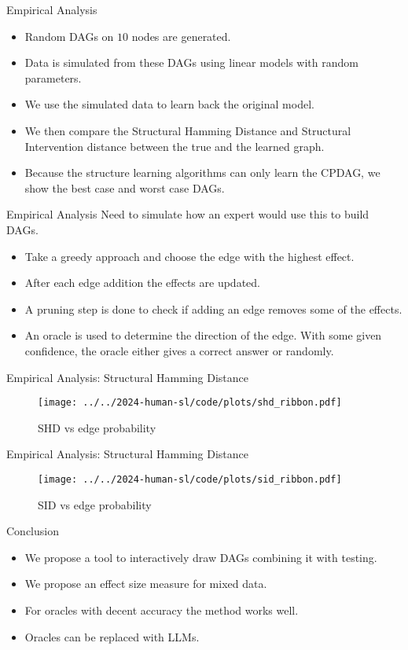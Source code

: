 \documentclass{beamer}
\begin{document}
\begin{frame}{Empirical Analysis}
	\begin{itemize}
		\item Random DAGs on $ 10 $ nodes are generated.
		\item Data is simulated from these DAGs using linear models with random parameters.
		\item We use the simulated data to learn back the original model.
		\item We then compare the Structural Hamming Distance and Structural Intervention distance between the true and the learned graph.
		\item Because the structure learning algorithms can only learn the CPDAG, we show the best case and worst case DAGs.
	\end{itemize}
\end{frame}

\begin{frame}{Empirical Analysis}
	Need to simulate how an expert would use this to build DAGs.
	\begin{itemize}
		\item Take a greedy approach and choose the edge with the highest effect.
		\item After each edge addition the effects are updated.
		\item A pruning step is done to check if adding an edge removes some of the effects.
		\item An oracle is used to determine the direction of the edge. With some given confidence, the oracle either gives
			a correct answer or randomly.
	\end{itemize}
\end{frame}

\begin{frame}{Empirical Analysis: Structural Hamming Distance}
	\begin{figure}
		\centering
		\texttt{[image: ../../2024-human-sl/code/plots/shd\_ribbon.pdf]}
		\caption{SHD vs edge probability}
	\end{figure}
\end{frame}

\begin{frame}{Empirical Analysis: Structural Hamming Distance}
	\begin{figure}
		\centering
		\texttt{[image: ../../2024-human-sl/code/plots/sid\_ribbon.pdf]}
		\caption{SID vs edge probability}
	\end{figure}
\end{frame}

\begin{frame}{Conclusion}
	\begin{itemize}
		\item We propose a tool to interactively draw DAGs combining it with testing.
		\item We propose an effect size measure for mixed data.
		\item For oracles with decent accuracy the method works well.
		\item Oracles can be replaced with LLMs.
	\end{itemize}
\end{frame}
\end{document}
